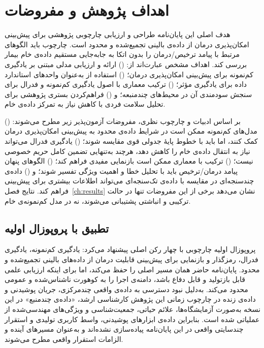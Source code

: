 \section{اهداف پژوهش و مفروضات}

هدف اصلی این پایان‌نامه طراحی و ارزیابی چارچوبی پژوهشی برای پیش‌بینی امکان‌پذیری درمان از داده‌ی بالینی تجمیع‌شده و محدود است. چارچوب باید الگوهای مرتبط با پیامد ترخیص/درمان را بدون اتکا به جابه‌جایی مستقیم داده‌ی خام بیمار بررسی کند. اهداف مشخص عبارت‌اند از: () ارائه و ارزیابی مدلی مبتنی بر یادگیری کم‌نمونه برای پیش‌بینی امکان‌پذیری درمان؛ () استفاده از  به‌عنوان واحدهای استاندارد داده برای یادگیری مؤثر؛ () ترکیب معماری  با اصول یادگیری کم‌نمونه و فدرال برای سنجش سودمندی آن در محیط‌های چندمنبعه؛ و () فراهم‌کردن بستری پژوهشی برای تحلیل سلامت فردی با کاهش نیاز به تمرکز داده‌ی خام.

بر اساس ادبیات و چارچوب نظری، مفروضات آزمون‌پذیر زیر مطرح می‌شوند: () مدل‌های کم‌نمونه ممکن است در شرایط داده‌ی محدود به پیش‌بینی امکان‌پذیری درمان کمک کنند، اما باید با خطوط پایۀ جدولی قوی مقایسه شوند؛ () یادگیری فدرال می‌تواند نیاز به انتقال داده‌ی خام را کاهش دهد، هرچند به‌تنهایی تضمین کامل حریم خصوصی نیست؛ () ترکیب  با معماری  ممکن است بازنمایی مفیدی فراهم کند؛ () الگوهای پنهان پیامد درمان/ترخیص باید با تحلیل خطا و اهمیت ویژگی تفسیر شوند؛ و () داده‌ی چندسنجه‌ای در مقایسه با داده‌ی تک‌سنجه‌ای می‌تواند اطلاعات بیشتری برای پیش‌بینی فراهم کند. نتایج فصل~\ref{ch:results} نشان می‌دهد برخی از این مفروضات تنها در حالت ترکیبی و انباشتی پشتیبانی می‌شوند، نه در مدل کم‌نمونه‌ی خام.

\subsection{تطبیق با پروپوزال اولیه}

پروپوزال اولیه چارچوبی با چهار رکن اصلی پیشنهاد می‌کرد: یادگیری کم‌نمونه، یادگیری فدرال، رمزگذار  و بازنمایی  برای پیش‌بینی قابلیت درمان از داده‌های بالینی تجمیع‌شده و محدود. پایان‌نامه حاضر همان مسیر اصلی را حفظ می‌کند، اما برای اینکه ارزیابی علمی قابل بازتولید و قابل دفاع باشد، دامنه‌ی اجرا را به کوهورت ناشناس‌شده و عمومی  محدود می‌کند. به‌دلیل نبود دسترسی به داده‌ی واقعی چندمرکزی، جریان پوشیدنی و داده‌ی زنده در چارچوب زمانی این پژوهش کارشناسی ارشد، «داده‌ی چندمنبع» در این نسخه به‌صورت آزمایشگاه‌ها، علائم حیاتی، جمعیت‌شناسی و ویژگی‌های مهندسی‌شده از  عملیاتی شده است. بنابراین داده‌ی ابزارهای پوشیدنی، واسط کاربری تولیدی و استقرار چندسایتی واقعی در این پایان‌نامه پیاده‌سازی نشده‌اند و به‌عنوان مسیرهای آینده و الزامات استقرار واقعی مطرح می‌شوند.


